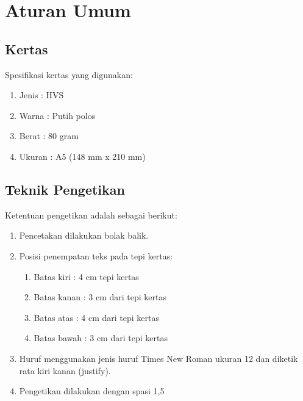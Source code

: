 \chapter{Aturan Umum}
\section{Kertas}
Spesifikasi kertas yang digunakan:
\begin{enumerate} 
\item Jenis : HVS
\item Warna : Putih polos
\item Berat : 80 gram
\item  Ukuran : A5 (148 mm x 210 mm)
\end{enumerate}

\section{Teknik Pengetikan}
Ketentuan pengetikan adalah sebagai berikut:\autocite{Reference1,Reference2,Reference3}
\begin{enumerate}
\item Pencetakan dilakukan bolak balik.
\item Posisi penempatan teks pada tepi kertas:
\begin{enumerate}
\item Batas kiri : 4 cm tepi kertas
\item Batas kanan : 3 cm dari tepi kertas
\item Batas atas : 4 cm dari tepi kertas
\item Batas bawah : 3 cm dari tepi kertas
\end{enumerate}
\item Huruf menggunakan jenis huruf Times New Roman ukuran 12 dan diketik rata kiri kanan
(justify).
\item Pengetikan dilakukan dengan spasi 1,5
\end{enumerate}
